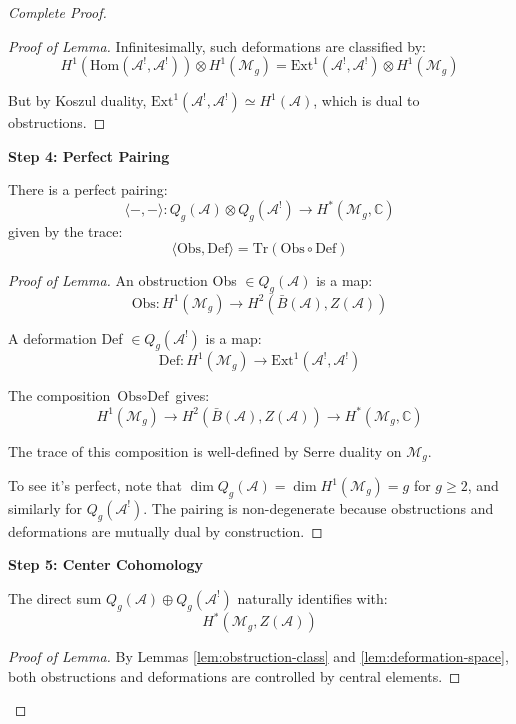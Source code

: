 \begin{proof}[Complete Proof]
\begin{proof}[Proof of Lemma]
Infinitesimally, such deformations are classified by:
$$H^1(\text{Hom}(\mathcal{A}^!, \mathcal{A}^!)) \otimes H^1(\mathcal{M}_g) 
= \text{Ext}^1(\mathcal{A}^!, \mathcal{A}^!) \otimes H^1(\mathcal{M}_g)$$

But by Koszul duality, $\text{Ext}^1(\mathcal{A}^!, \mathcal{A}^!) \simeq 
H^1(\mathcal{A})$, which is dual to obstructions.
\end{proof}

\textbf{Step 4: Perfect Pairing}

\begin{lemma}\label{lem:obs-def-pairing}
There is a perfect pairing:
$$\langle -, - \rangle: Q_g(\mathcal{A}) \otimes Q_g(\mathcal{A}^!) \to 
H^*(\mathcal{M}_g, \mathbb{C})$$
given by the trace:
$$\langle \text{Obs}, \text{Def} \rangle = \text{Tr}(\text{Obs} \circ \text{Def})$$
\end{lemma}

\begin{proof}[Proof of Lemma]
An obstruction Obs $\in Q_g(\mathcal{A})$ is a map:
$$\text{Obs}: H^1(\mathcal{M}_g) \to H^2(\bar{B}(\mathcal{A}), Z(\mathcal{A}))$$

A deformation Def $\in Q_g(\mathcal{A}^!)$ is a map:
$$\text{Def}: H^1(\mathcal{M}_g) \to \text{Ext}^1(\mathcal{A}^!, \mathcal{A}^!)$$

The composition $\text{Obs} \circ \text{Def}$ gives:
$$H^1(\mathcal{M}_g) \to H^2(\bar{B}(\mathcal{A}), Z(\mathcal{A})) 
\to H^*(\mathcal{M}_g, \mathbb{C})$$

The trace of this composition is well-defined by Serre duality on $\mathcal{M}_g$.

To see it's perfect, note that $\dim Q_g(\mathcal{A}) = \dim H^1(\mathcal{M}_g) 
= g$ for $g \geq 2$, and similarly for $Q_g(\mathcal{A}^!)$. The pairing is 
non-degenerate because obstructions and deformations are mutually dual by construction.
\end{proof}

\textbf{Step 5: Center Cohomology}

\begin{lemma}\label{lem:center-cohomology}
The direct sum $Q_g(\mathcal{A}) \oplus Q_g(\mathcal{A}^!)$ naturally identifies with:
$$H^*(\mathcal{M}_g, Z(\mathcal{A}))$$
\end{lemma}

\begin{proof}[Proof of Lemma]
By Lemmas \ref{lem:obstruction-class} and \ref{lem:deformation-space}, both 
obstructions and deformations are controlled by central elements.


\end{proof}
\end{proof}
